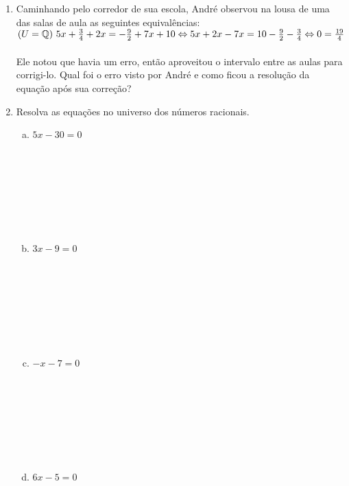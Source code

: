 \documentclass[a4paper,14pt]{article}
\begin{document}
\begin{multicols}{2}
\begin{enumerate}
\begin{enumerate}[a)]
    		\end{enumerate}
    		\item Caminhando pelo corredor de sua escola, André observou na lousa de uma das salas de aula as seguintes equivalências: \\ $(U = \mathbb{Q})\\~5x + \frac{3}{4} + 2x = -\frac{9}{2} + 7x + 10 \Leftrightarrow \\ 5x + 2x - 7x = 10 - \frac{9}{2} - \frac{3}{4} \Leftrightarrow \\ 0 = \frac{19}{4}$ \\\\
    		Ele notou que havia um erro, então aproveitou o intervalo entre as aulas para corrigi-lo. Qual foi o erro visto por André e como ficou a resolução da equação após sua correção? \newpage
    		\item Resolva as equações no universo dos números racionais.
    		\begin{enumerate}[a)]
    			\item $5x - 30 = 0$ \\\\\\\\\\\\\\\\
    			\item $3x - 9 = 0$ \\\\\\\\\\\\\\\\
    			\item $-x - 7 = 0$ \\\\\\\\\\\\\\\\
    			\item $6x - 5 = 0$ \\\\\\\\\\\\\\\\\\

\end{enumerate}
\end{enumerate}
\end{multicols}
\end{document}
